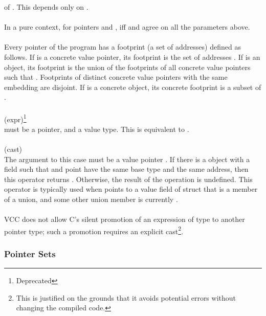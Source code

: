 \documentclass[preprint,nocopyrightspace]{sigplanconf}
\begin{document}
{{of . This depends only on . 
\\\\
In a pure context, for pointers  and , 
iff  and  agree on all the parameters above.
\\\\
Every pointer of the program has a footprint (a set of addresses)
defined as follows.  If  is a concrete value pointer, its footprint
is the set of addresses
\vcc{[\addr(p),\addr(p) + \sizeof_object(p))}.
If  is an object, its footprint is the union of
the footprints of all concrete value pointers 
 such that . 
Footprints of distinct concrete value pointers with the same
embedding are disjoint.  If  is a concrete object, its concrete
footprint is a subset of 
\vcc{[\addr(p),\addr(p) + \sizeof_object(p))}.
\\\\
 (expr)\footnote{Deprecated}\\
 must be a pointer, and  a value type. 
This is equivalent to 
.
\\\\
 (cast)\\
The argument to this case must be a value pointer .
If there is a \vcc{\valid} object  with a field 
such that  and  point have the same base type and
the same address, then this operator returns . Otherwise,
the result of the operation is undefined.
This operator is typically used when  points to a value
field of struct that is a member of a union, and some other union
member is currently \vcc{\valid}.  
\\\\
VCC does not allow C's silent promotion of an expression of
type  to another pointer type; such a promotion requires
an explicit cast\footnote{This is justified on the grounds that it avoids
potential errors without changing the compiled code.}.

\subsubsection{Pointer Sets}

}}
\end{document}

